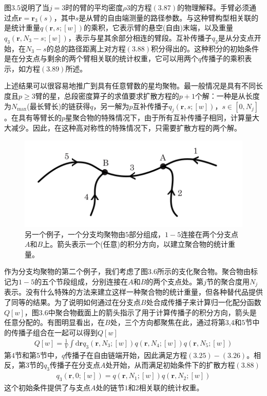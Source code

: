 图$3.5$说明了当$j=3$时的臂的平均密度$\rho 3$的方程$(3.87)$的物理解释。手臂必须通过点$\mathbf{r}=\mathbf{r}_3(s)$，其中$s$是从臂的自由端测量的路径参数。与这种臂构型相关联的是统计重量$q(\mathbf{r},s;[w])$的乘积，它表示臂的悬空(自由)末端，以及重量$q_{3}(\mathbf{r},N_{3}-s;[w])$，表示与星其余部分相连的臂段。互补传播子$q_3$是从分支点开始，在$N_3-s$的总的路径距离上对方程$(3.88)$积分得出的。这种积分的初始条件是在分支点与剩余的两个臂相关联的统计权重，它可以用两个$q$传播子的乘积表示，如方程$(3.89)$所述。

上述结果可以很容易地推广到具有任意臂数的星均聚物。最一般情况是具有不同长度且$p\geq3$臂的星，总段密度算子的求值要求扩散方程的$p+1$个解：一种是从长度为$N_{\max}$(最长臂长)的链获得$q$，另一解为$p$互补传播子$q_j(\mathbf{r},s;[w])$，$s\in [0,N_j]$。在具有等臂长的$p$星聚合物的特殊情况下，由于所有互补传播子相同，计算量大大减少。因此，在这种高对称性的特殊情况下，只需要扩散方程的两个解。

\begin{figure}[H]
\centering
\includegraphics[scale=0.7]{./figures/36.png}
\caption{另一个例子，一个分支均聚物由$5$部分组成，$1-5$连接在两个分支点$A$和$B$上。箭头表示一个(任意)的积分方向，以建立聚合物的统计重量。}
\end{figure}

作为分支均聚物的第二个例子，我们考虑了图$3.6$所示的支化聚合物。聚合物由标记为$1-5$的五个节段组成，分别连接在$A$和$B$的两个支点处。第$j$节的聚合度用$N_j$表示。没有什么特殊的方法来建立这样一种聚合物的统计重量，但各种替代品提供了同等的结果。为了说明如何通过在分支点$B$处合成传播子来计算归一化配分函数$Q[w]$，图$3.6$中聚合物截面上的箭头指示了用于计算传播子的积分方向，箭头是任意分配的。有图明显看出，在$B$处，三个方向都聚焦在此，通过将第$3$,$4$和$5$节中的传播子组合在一起可以得到$Q[w]$
\begin{gather}
Q[w]=\frac{1}{V}\int \mathrm{d}\mathbf{r}q_3(\mathbf{r},N_3;[w])q(\mathbf{r},N_4;[w])q(\mathbf{r},N_5;[w])
\end{gather}
第$4节$和第$5$节中，$q$传播子在自由链端开始，因此满足方程$(3.25)-(3.26)$。相反，第3节的$q_3$传播子在分支点$A$处开始，从而满足初始条件下的扩散方程$(3.88)$
\begin{gather}
q_3(\mathbf{r},0;[w])=q(\mathbf{r},N_1;[w])q(\mathbf{r},N_2;[w])
\end{gather}
这个初始条件提供了与支点$A$处的链节$1$和$2$相关联的统计权重。

